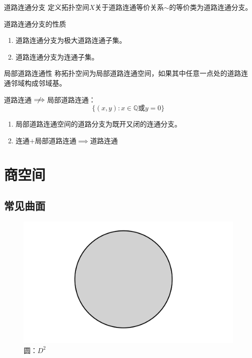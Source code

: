 \documentclass[lang = cn, scheme = chinese, thmcnt = section, usesamecnt]{elegantbook}
\newcommand{\Q}{\mathbb{Q}}            %
\begin{document}
\begin{definition}{道路连通分支}
	定义拓扑空间$X$关于道路连通等价关系$\sim$的等价类为道路连通分支。
\end{definition}

\begin{proposition}{道路连通分支的性质}
	\begin{enumerate}
		\item 道路连通分支为极大道路连通子集。
		\item 道路连通分支为连通子集。
	\end{enumerate}
\end{proposition}

\begin{definition}{局部道路连通性}
	称拓扑空间为局部道路连通空间，如果其中任意一点处的道路连通邻域构成邻域基。
\end{definition}

\begin{remark}
	道路连通$\centernot\implies$局部道路连通：%
	$$
	\{ (x,y):x\in\Q\text{或}y=0 \}
	$$
\end{remark}

\begin{proposition}
	\begin{enumerate}
		\item 局部道路连通空间的道路分支为既开又闭的连通分支。
		\item 连通$+$局部道路连通$\implies$道路连通
	\end{enumerate}
\end{proposition}

\chapter{商空间}

\section{常见曲面}

\begin{figure}[H]
	\centering
	\caption{圆：$D^2$}
	\includegraphics[scale = 0.15]{figure/圆}
\end{figure}
\end{document}
